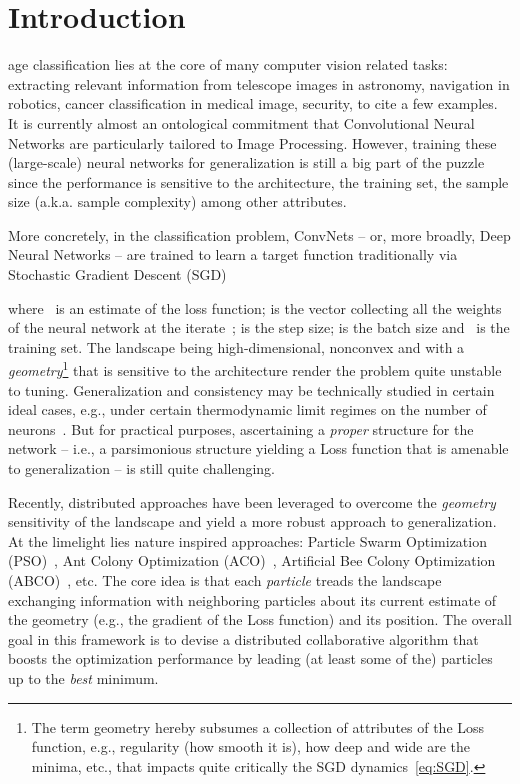\documentclass{ieeeaccess}
\begin{document}
\section{Introduction}
 age classification lies at the core of many computer vision related tasks: extracting relevant information from telescope images in astronomy, navigation in robotics, cancer classification in medical image, security, to cite a few examples. It is currently almost an ontological commitment that Convolutional Neural Networks are particularly tailored to Image Processing. However, training these (large-scale) neural networks for generalization is still a big part of the puzzle since the performance is sensitive to the architecture, the training set, the sample size (a.k.a. sample complexity) among other attributes.

More concretely, in the classification problem, ConvNets -- or, more broadly, Deep Neural Networks -- are trained to learn a target function  traditionally via Stochastic Gradient Descent (SGD)

where~ is an estimate of the loss function;  is the vector collecting all the weights of the neural network at the iterate~;  is the step size;  is the batch size and~ is the training set. The landscape being high-dimensional, nonconvex and with a \emph{geometry}\footnote{The term geometry hereby subsumes a collection of attributes of the Loss function, e.g., regularity (how smooth it is), how deep and wide are the minima, etc., that impacts quite critically the SGD dynamics~\eqref{eq:SGD}.} that is sensitive to the architecture render the problem quite unstable to tuning. Generalization and consistency may be technically studied in certain ideal cases, e.g., under certain thermodynamic limit regimes on the number of neurons~\cite{mei2018mean}. But for practical purposes, ascertaining a \emph{proper} structure for the network -- i.e., a parsimonious structure yielding a Loss function that is amenable to generalization -- is still quite challenging.

Recently, distributed approaches have been leveraged to overcome the \emph{geometry} sensitivity of the landscape and yield a more robust approach to generalization. At the limelight lies nature inspired approaches: Particle Swarm Optimization (PSO)~\cite{houssein2021major,kennedy1995particle,shi1998modified}, Ant Colony Optimization (ACO)~\cite{rokbani2021bi,dorigo2006ant}, Artificial Bee Colony Optimization (ABCO)~\cite{jacob2021artificial,karaboga2005idea}, etc. The core idea is that each \emph{particle} treads the landscape exchanging information with neighboring particles about its current estimate of the geometry (e.g., the gradient of the Loss function) and its position. The overall goal in this framework is to devise a distributed collaborative algorithm that boosts the optimization performance by leading (at least some of the) particles up to the \emph{best} minimum.
\end{document}
